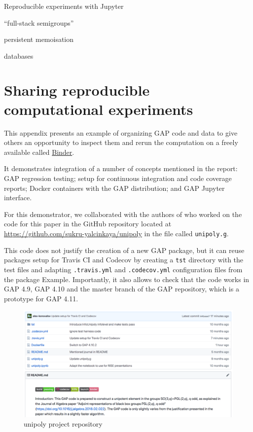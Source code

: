 \documentclass{deliverablereport}
\begin{document}
Reproducible experiments with Jupyter

``full-stack semigroups''

persistent memoisation

databases

\newpage
\appendix

\section{Sharing reproducible computational experiments}\label{repro-gap}

This appendix presents an example of organizing GAP code 
and data to give others an opportunity to inspect them and rerun
the computation on a freely available called \href{https://mybinder.org/}{Binder}.

It demonstrates integration of a number of concepts mentioned
in the report: GAP regression testing; setup for continuous
integration and code coverage reports; Docker containers with
the GAP distribution; and GAP Jupyter interface.

For this demonstrator, we collaborated with the authors of \cite{black-box} 
who worked on the code for this paper in the GitHub repository located 
at \url{https://github.com/sukru-yalcinkaya/unipoly} in the file 
called {\tt unipoly.g}.

This code does not justify the creation of a new GAP package, 
but it can reuse packages setup for Travis CI and Codecov by 
creating a {\tt tst} directory with the test files and adapting
{\tt .travis.yml} and {\tt .codecov.yml} configuration files
from the \GAP package {\sf Example}. Importantly, it also
allows to check that the code works in GAP 4.9, GAP 4.10 and 
the master branch of the GAP repository, which is a prototype for
GAP 4.11.

\begin{figure}[!ht]
    \centering
    \includegraphics[width=\textwidth]{images/unipoly-repo}
    \caption{unipoly project repository}
    \label{fig:unipoly-repo}
\end{figure}
\end{document}
